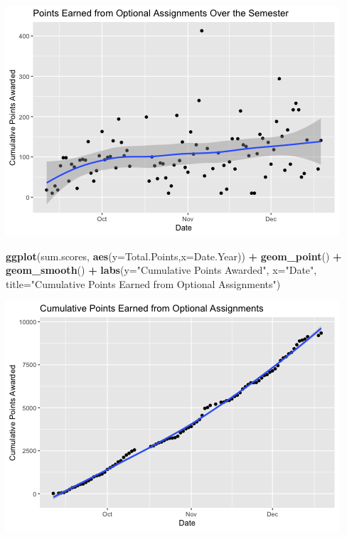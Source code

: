 \documentclass[]{article}
\newenvironment{Shaded}{\begin{snugshade}}{\end{snugshade}}
\newcommand{\KeywordTok}[1]{\textcolor[rgb]{0.13,0.29,0.53}{\textbf{#1}}}
\newcommand{\DataTypeTok}[1]{\textcolor[rgb]{0.13,0.29,0.53}{#1}}
\newcommand{\StringTok}[1]{\textcolor[rgb]{0.31,0.60,0.02}{#1}}
\newcommand{\OperatorTok}[1]{\textcolor[rgb]{0.81,0.36,0.00}{\textbf{#1}}}
\newcommand{\NormalTok}[1]{#1}
\begin{document}
\includegraphics{figures/submitted-assignments-1.png}

\begin{Shaded}
\begin{Highlighting}[]
\KeywordTok{ggplot}\NormalTok{(sum.scores, }\KeywordTok{aes}\NormalTok{(}\DataTypeTok{y=}\NormalTok{Total.Points,}\DataTypeTok{x=}\NormalTok{Date.Year)) }\OperatorTok{+}
\StringTok{  }\KeywordTok{geom_point}\NormalTok{() }\OperatorTok{+}
\StringTok{  }\KeywordTok{geom_smooth}\NormalTok{() }\OperatorTok{+}
\StringTok{  }\KeywordTok{labs}\NormalTok{(}\DataTypeTok{y=}\StringTok{"Cumulative Points Awarded"}\NormalTok{,}
       \DataTypeTok{x=}\StringTok{"Date"}\NormalTok{,}
       \DataTypeTok{title=}\StringTok{"Cumulative Points Earned from Optional Assignments"}\NormalTok{)}
\end{Highlighting}
\end{Shaded}

\includegraphics{figures/submitted-assignments-2.png}
\end{document}
